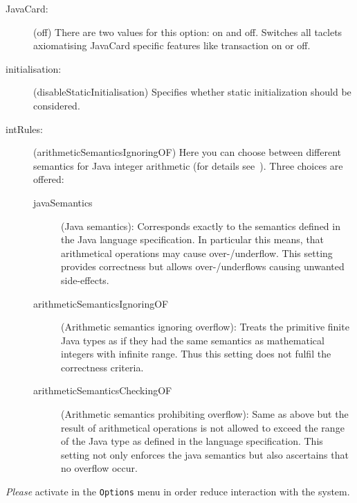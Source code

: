 \begin{description}
      \item[JavaCard:] (\textsf{off}) There are two values for this option:
      \textsf{on} and \textsf{off}. Switches all
      taclets axiomatising JavaCard specific features like
      transaction on or off. 
  
   \item[initialisation:] (\textsf{disableStaticInitialisation})
      Specifies whether static initialization should be considered.

    \item[intRules:] \label{sec:integersem}
      (\textsf{arithmeticSemanticsIgnoringOF}) Here you can choose
      between different semantics for Java integer arithmetic (for
      details
      see~\cite{Schlager02,SchlagerPhD2007,KeYBook2007}). Three
      choices are offered:

      \begin{description}

      
      \item[\textsf{javaSemantics}] (Java semantics): Corresponds
        exactly to the semantics defined in the Java language
        specification. In particular this means, that arithmetical
        operations may cause over-/underflow. This setting provides
        correctness but allows over-/underflows causing unwanted
        side-effects.
      \item[\textsf{arithmeticSemanticsIgnoringOF}] (Arithmetic
        semantics ignoring overflow): Treats the primitive
        finite Java types as if they had the same semantics as
        mathematical integers with infinite range. Thus this setting
        does not fulfil the correctness criteria.
      \item[\textsf{arithmeticSemanticsCheckingOF}] (Arithmetic
        semantics prohibiting overflow): Same as above but the result
        of arithmetical operations is not allowed to exceed the range
        of the Java type as defined in the language
        specification. This setting not only enforces the java
        semantics but also ascertains that no overflow occur.
      \end{description}

\end{description}

\emph{Please} activate  in the
\texttt{Options} menu in order reduce interaction with the system.

